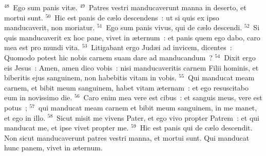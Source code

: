 ${}^{48}$~Ego sum panis vit\ae .
${}^{49}$~Patres vestri manducaverunt manna in deserto, et mortui sunt.
${}^{50}$~Hic est panis de c\ae lo descendens~: ut si quis ex ipso manducaverit, non moriatur.
${}^{51}$~Ego sum panis vivus, qui de c\ae lo descendi.
${}^{52}$~Si quis manducaverit ex hoc pane, vivet in \ae ternum~: et panis quem ego dabo, caro mea est pro mundi vita.
${}^{53}$~Litigabant ergo Jud\ae i ad invicem, dicentes~: Quomodo potest hic nobis carnem suam dare ad manducandum~?
${}^{54}$~Dixit ergo eis Jesus~: Amen, amen dico vobis~: nisi manducaveritis carnem Filii hominis, et biberitis ejus sanguinem, non habebitis vitam in vobis.
${}^{55}$~Qui manducat meam carnem, et bibit meum sanguinem, habet vitam \ae ternam~: et ego resuscitabo eum in novissimo die.
${}^{56}$~Caro enim mea vere est cibus~: et sanguis meus, vere est potus~;
${}^{57}$~qui manducat meam carnem et bibit meum sanguinem, in me manet, et ego in illo.
${}^{58}$~Sicut misit me vivens Pater, et ego vivo propter Patrem~: et qui manducat me, et ipse vivet propter me.
${}^{59}$~Hic est panis qui de c\ae lo descendit. Non sicut manducaverunt patres vestri manna, et mortui sunt. Qui manducat hunc panem, vivet in \ae ternum.


